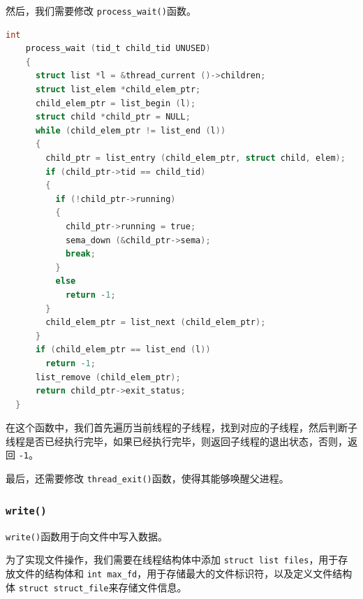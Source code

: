 \documentclass{article}
\begin{document}
然后，我们需要修改 \texttt{process\_wait()}函数。

\begin{lstlisting}[language=C, title=\texttt{src/userprog/process.c - process\_wait()}]
    int
    process_wait (tid_t child_tid UNUSED) 
    {
      struct list *l = &thread_current ()->children;
      struct list_elem *child_elem_ptr;
      child_elem_ptr = list_begin (l);
      struct child *child_ptr = NULL;
      while (child_elem_ptr != list_end (l))
      {
        child_ptr = list_entry (child_elem_ptr, struct child, elem);
        if (child_ptr->tid == child_tid)
        {
          if (!child_ptr->running)
          {
            child_ptr->running = true;
            sema_down (&child_ptr->sema);
            break;
          } 
          else 
            return -1;
        }
        child_elem_ptr = list_next (child_elem_ptr);
      }
      if (child_elem_ptr == list_end (l))
        return -1;
      list_remove (child_elem_ptr);
      return child_ptr->exit_status;
  }
\end{lstlisting}

在这个函数中，我们首先遍历当前线程的子线程，找到对应的子线程，然后判断子线程是否已经执行完毕，如果已经执行完毕，则返回子线程的退出状态，否则，返回 \texttt{-1}。

最后，还需要修改 \texttt{thread\_exit()}函数，使得其能够唤醒父进程。

\subsubsection{\texttt{write()}}

\texttt{write()}函数用于向文件中写入数据。

为了实现文件操作，我们需要在线程结构体中添加 \texttt{struct list files}，用于存放文件的结构体和 \texttt{int max\_fd}，用于存储最大的文件标识符，以及定义文件结构体 \texttt{struct struct\_file}来存储文件信息。
\end{document}
